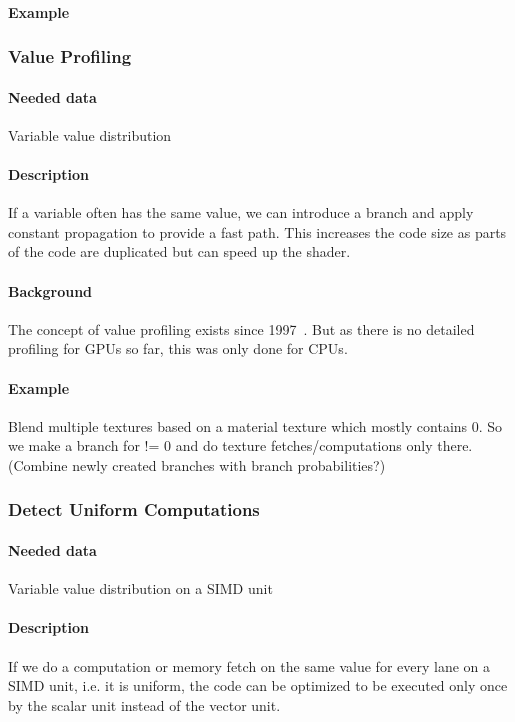 \paragraph{Example}

\subsubsection{Value Profiling}
\paragraph{Needed data} Variable value distribution
\paragraph{Description} If a variable often has the same value, we can introduce a branch and apply constant propagation to provide a fast path. This increases the code size as parts of the code are duplicated but can speed up the shader.
\paragraph{Background} The concept of value profiling exists since 1997~\cite{Calder1997}. But as there is no detailed profiling for GPUs so far, this was only done for CPUs.
\paragraph{Example} Blend multiple textures based on a material texture which mostly contains 0. So we make a branch for != 0 and do texture fetches/computations only there. (Combine newly created branches with branch probabilities?)

\subsubsection{Detect Uniform Computations}
\paragraph{Needed data} Variable value distribution on a SIMD unit
\paragraph{Description} If we do a computation or memory fetch on the same value for every lane on a SIMD unit, i.e. it is uniform, the code can be optimized to be executed only once by the scalar unit instead of the vector unit.
